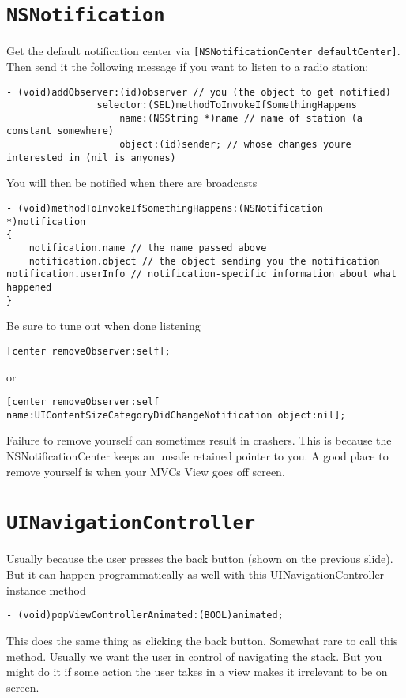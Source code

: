 \documentclass[12pt]{article}
\newcommand{\co}{\texttt}
\begin{document}
\section{\co{NSNotification}}
Get the default notification center via \co{[NSNotificationCenter defaultCenter]}. Then send it the following message if you want to listen to a radio station:
\begin{lstlisting}
- (void)addObserver:(id)observer // you (the object to get notified)
		  		selector:(SEL)methodToInvokeIfSomethingHappens
		      		name:(NSString *)name // name of station (a constant somewhere)
		     		object:(id)sender; // whose changes youre interested in (nil is anyones)
\end{lstlisting}
You will then be notified when there are broadcasts
\begin{lstlisting}
- (void)methodToInvokeIfSomethingHappens:(NSNotification *)notification
{
	notification.name // the name passed above
	notification.object // the object sending you the notification notification.userInfo // notification-specific information about what happened
}
\end{lstlisting}
Be sure to tune out when done listening
\begin{lstlisting}
[center removeObserver:self];
\end{lstlisting}
or
\begin{lstlisting}
[center removeObserver:self name:UIContentSizeCategoryDidChangeNotification object:nil];
\end{lstlisting}
Failure to remove yourself can sometimes result in crashers.
This is because the NSNotificationCenter keeps an unsafe retained pointer to you.
A good place to remove yourself is when your MVCs View goes off screen.

\section{\co{UINavigationController}}
Usually because the user presses the back button (shown on the previous slide).
But it can happen programmatically as well with this UINavigationController instance method 
\begin{lstlisting}
- (void)popViewControllerAnimated:(BOOL)animated;
\end{lstlisting}
This does the same thing as clicking the back button.
Somewhat rare to call this method. Usually we want the user in control of navigating the stack. But you might do it if some action the user takes in a view makes it irrelevant to be on screen.
\end{document}
